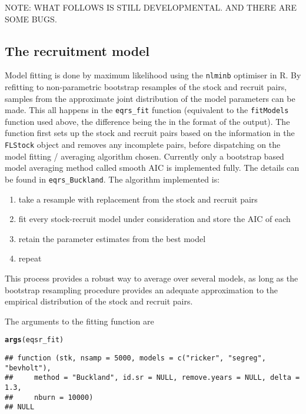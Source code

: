 \documentclass[a4paper]{article}\usepackage{graphicx, color}
\makeatletter
\newcommand{\hlfunctioncall}[1]{\textcolor[rgb]{0.501960784313725,0,0.329411764705882}{\textbf{#1}}}%
\newenvironment{kframe}{%
 \def\at@end@of@kframe{}%
 \ifinner\ifhmode%
  \def\at@end@of@kframe{\end{minipage}}%
  \begin{minipage}{\columnwidth}%
 \fi\fi%
 \def\FrameCommand##1{\hskip\@totalleftmargin \hskip-\fboxsep
 \colorbox{shadecolor}{##1}\hskip-\fboxsep
     \hskip-\linewidth \hskip-\@totalleftmargin \hskip\columnwidth}%
 \MakeFramed {\advance\hsize-\width
   \@totalleftmargin\z@ \linewidth\hsize
   \@setminipage}}%
 {\par\unskip\endMakeFramed%
 \at@end@of@kframe}
\newenvironment{knitrout}{}{} %
\makeatother
\begin{document}
\newpage{}
NOTE: WHAT FOLLOWS IS STILL DEVELOPMENTAL. AND THERE ARE SOME BUGS.
\subsection{The recruitment model}
Model fitting is done by maximum likelihood using the \texttt{nlminb} optimiser in R. By refitting to non-parametric bootstrap resamples of the stock and recruit pairs, samples from the approximate joint distribution of the model parameters can be made.  This all happens in the \texttt{eqrs\_fit} function (equivalent to the \texttt{fitModels} function used above, the difference being the in the format of the output).  The function first sets up the stock and recruit pairs based on the information in the \texttt{FLStock} object and removes any incomplete pairs, before dispatching on the model fitting / averaging algorithm chosen.  Currently only a bootstrap based model averaging method called smooth AIC is implemented fully.  The details can be found in \texttt{eqrs\_Buckland}.  The algorithm implemented is:

\begin{enumerate}
\item take a resample with replacement from the stock and recruit pairs
\item fit every stock-recruit model under consideration and store the AIC of each
\item retain the parameter estimates from the best model
\item repeat
\end{enumerate}

This process provides a robust way to average over several models, as long as the bootstrap resampling procedure provides an adequate approximation to the empirical distribution of the stock and recruit pairs.

The arguments to the fitting function are
\begin{knitrout}
\color{fgcolor}\begin{kframe}
\begin{alltt}
\hlfunctioncall{args}(eqsr_fit)
\end{alltt}
\begin{verbatim}
## function (stk, nsamp = 5000, models = c("ricker", "segreg", "bevholt"), 
##     method = "Buckland", id.sr = NULL, remove.years = NULL, delta = 1.3, 
##     nburn = 10000) 
## NULL
\end{verbatim}
\end{kframe}
\end{knitrout}
\end{document}
